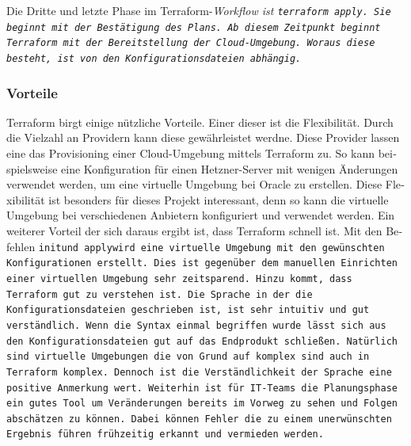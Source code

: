 \begin{otherlanguage}{ngerman}
Die Dritte und letzte Phase im Terraform-\it Workflow \rm ist \tt terraform apply\rm. Sie beginnt mit der Bestätigung des Plans. Ab diesem Zeitpunkt beginnt Terraform mit der Bereitstellung der Cloud-Umgebung. Woraus diese besteht, ist von den Konfigurationsdateien abhängig. 

\subsubsection{Vorteile}
Terraform birgt einige nützliche Vorteile. Einer dieser ist die Flexibilität. Durch die Vielzahl an Providern kann diese gewährleistet werdne. Diese Provider lassen eine das Provisioning einer Cloud-Umgebung mittels Terraform zu. So kann beispielsweise eine Konfiguration für einen Hetzner-Server mit wenigen Änderungen verwendet werden, um eine virtuelle Umgebung bei \dq Oracle \dq{} zu erstellen. Diese Flexibilität ist besonders für dieses Projekt interessant, denn so kann die virtuelle Umgebung bei verschiedenen Anbietern konfiguriert und verwendet werden. 
\newline 
Ein weiterer Vorteil der sich daraus ergibt ist, dass Terraform schnell ist. Mit den Befehlen \tt init\rm und \tt apply\rm wird eine virtuelle Umgebung mit den gewünschten Konfigurationen erstellt. Dies ist gegenüber dem manuellen Einrichten einer virtuellen Umgebung sehr zeitsparend. 
\newline
Hinzu kommt, dass Terraform gut zu verstehen ist. Die Sprache in der die Konfigurationsdateien geschrieben ist, ist sehr intuitiv und gut verständlich. Wenn die Syntax einmal begriffen wurde lässt sich aus den Konfigurationsdateien gut auf das Endprodukt schließen. Natürlich sind virtuelle Umgebungen die von Grund auf komplex sind auch in Terraform komplex. Dennoch ist die Verständlichkeit der Sprache eine positive Anmerkung wert.
\newline
Weiterhin ist für IT-Teams die Planungsphase ein gutes Tool um Veränderungen bereits im Vorweg zu sehen und Folgen abschätzen zu können. Dabei können Fehler die zu einem unerwünschten Ergebnis führen frühzeitig erkannt und vermieden werden.
\end{otherlanguage}